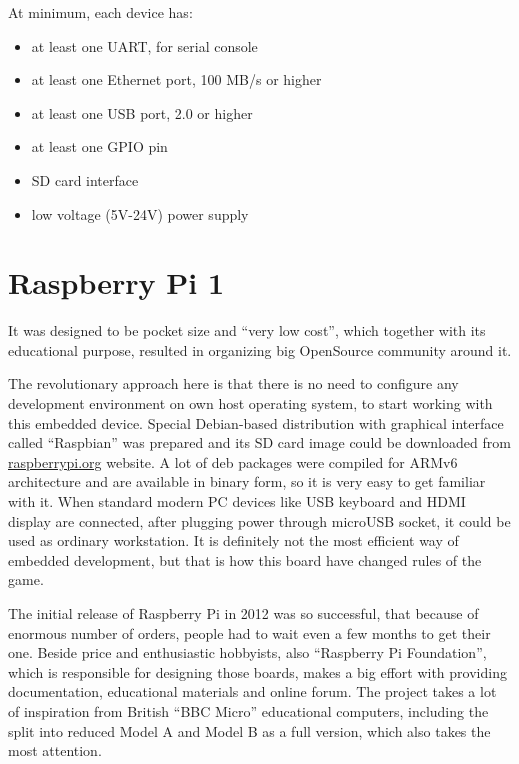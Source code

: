 \documentclass[printmode]{mgr}
\begin{document}
At minimum, each device has:
\begin{itemize}
  \item at least one UART, for serial console
  \item at least one Ethernet port, 100 MB/s or higher
  \item at least one USB port, 2.0 or higher
  \item at least one GPIO pin
  \item SD card interface
  \item low voltage (5V-24V) power supply
\end{itemize}



\section{Raspberry Pi 1}


It was designed to be pocket size and ``very low cost''\cite{web:raspberrypi-lowcost}, which together with its educational purpose, resulted in organizing big OpenSource community around it.

The revolutionary approach here is that there is no need to configure any development environment on own host operating system, to start working with this embedded device.
Special Debian-based distribution with graphical interface called ``Raspbian'' was prepared and its SD card image could be downloaded from \url{raspberrypi.org} website.
A lot of deb packages were compiled for ARMv6 architecture and are available in binary form, so it is very easy to get familiar with it.\cite{web:raspberrypi-raspbian}
When standard modern PC devices like USB keyboard and HDMI display are connected, after plugging power through microUSB socket, it could be used as ordinary workstation.
It is definitely not the most efficient way of embedded development, but that is how this board have changed rules of the game.

The initial release of Raspberry Pi in 2012 was so successful, that because of enormous number of orders, people had to wait even a few months to get their one. 
Beside price and enthusiastic hobbyists, also ``Raspberry Pi Foundation'', which is responsible for designing those boards, makes a big effort with providing documentation, educational materials and online forum.\cite{web:raspberrypi-forum}
The project takes a lot of inspiration from British ``BBC Micro'' educational computers, including the split into reduced Model A and Model B as a full version, which also takes the most attention.
\end{document}
